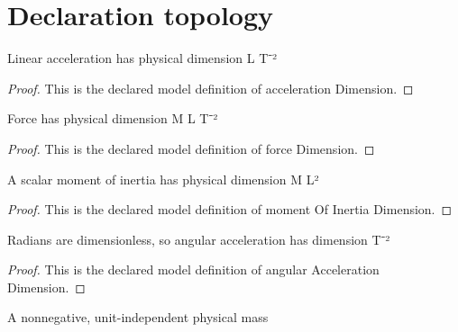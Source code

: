 \section{Declaration topology}
\begin{definition}
  \label{def:physics:phyx-mini-0783:phyxminiproblems-problemphyxmini0783-accelerationdimension}
  Linear acceleration has physical dimension L T⁻²
\end{definition}
\begin{proof}
  This is the declared model definition of acceleration Dimension.
\end{proof}
\begin{definition}
  \label{def:physics:phyx-mini-0783:phyxminiproblems-problemphyxmini0783-forcedimension}
  Force has physical dimension M L T⁻²
\end{definition}
\begin{proof}
  This is the declared model definition of force Dimension.
\end{proof}
\begin{definition}
  \label{def:physics:phyx-mini-0783:phyxminiproblems-problemphyxmini0783-momentofinertiadimension}
  A scalar moment of inertia has physical dimension M L²
\end{definition}
\begin{proof}
  This is the declared model definition of moment Of Inertia Dimension.
\end{proof}
\begin{definition}
  \label{def:physics:phyx-mini-0783:phyxminiproblems-problemphyxmini0783-angularaccelerationdimension}
  Radians are dimensionless, so angular acceleration has dimension T⁻²
\end{definition}
\begin{proof}
  This is the declared model definition of angular Acceleration Dimension.
\end{proof}
\begin{definition}
  \label{def:physics:phyx-mini-0783:phyxminiproblems-problemphyxmini0783-massquantity}
  A nonnegative, unit-independent physical mass
\end{definition}
